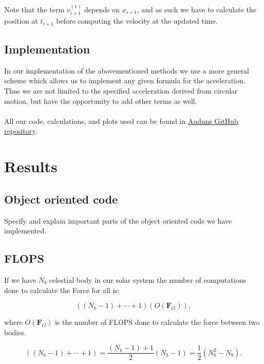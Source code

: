 \documentclass[a4paper, fontsize=11pt]{article}
\begin{document}
Note that the term $v_{i+1}^{(1)}$ depends on $x_{i+1}$, and as such we have to calculate the position at $t_{i+1}$ before computing the velocity at the updated time. \cite{ODE}



\subsection{Implementation}

In our implementation of the abovementioned methods we use a more general scheme which allows us to implement any given formula for the acceleration. Thus we are not limited to the specified acceleration derived from circular motion, but have the opportunity to add other terms as well. 


\paragraph{}
All our code, calculations, and plots used can be found in \href{https://github.com/auduntre/FYS4150/tree/master/Project%203}{Auduns GitHub repository}.

\section{Results}
\subsection{Object oriented code}

Specify and explain important parts of the object oriented code we have implemented.


\subsection{FLOPS}

If we have $N_b$ celestial body in our solar system the number of computations done to calculate the Force for all is:

\begin{equation}
\left((N_b  - 1) + \cdots + 1\right)(O(\textbf{F}_{G})),
\end{equation}

where $O(\textbf{F}_{G})$ is the number of FLOPS done to calculate the force between two bodies.

\begin{equation}
\left((N_b  - 1) + \cdots + 1\right) = \frac{(N_b  - 1) + 1}{2}(N_b - 1) = \frac{1}{2}(N_b^2 - N_b).
\end{equation}
\end{document}
